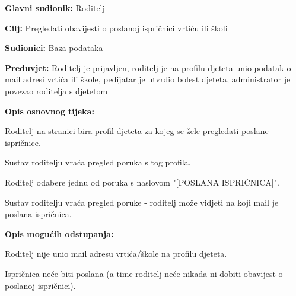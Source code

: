 					
					\noindent {}
					\begin{packed_item}
						
						\item \textbf{Glavni sudionik: }Roditelj
						\item  \textbf{Cilj:} Pregledati obavijesti o poslanoj ispričnici vrtiću ili školi
						\item  \textbf{Sudionici:} Baza podataka
						\item  \textbf{Preduvjet:} Roditelj je prijavljen, roditelj je na profilu djeteta unio podatak o mail adresi vrtića ili škole, pedijatar je utvrdio bolest djeteta, administrator je povezao roditelja s djetetom
						\item  \textbf{Opis osnovnog tijeka:}
						
						\item[] \begin{packed_enum}
							
							\item Roditelj na stranici bira profil djeteta za kojeg se žele pregledati poslane ispričnice.
							\item Sustav roditelju vraća pregled poruka s tog profila.
							\item Roditelj odabere jednu od poruka s naslovom "[POSLANA ISPRIČNICA]".
							\item Sustav roditelju vraća pregled poruke - roditelj može vidjeti na koji mail je poslana ispričnica.
						\end{packed_enum}
						\item  \textbf{Opis mogućih odstupanja:}
						
						\item[] \begin{packed_item}
							
							\item[4.a] Roditelj nije unio mail adresu vrtića/škole na profilu djeteta.
							\item[] \begin{packed_enum}
								
								\item Ispričnica neće biti poslana (a time roditelj neće nikada ni dobiti obavijest o poslanoj ispričnici).
							\end{packed_enum}
							
							
						\end{packed_item}
						
					\end{packed_item}
					
